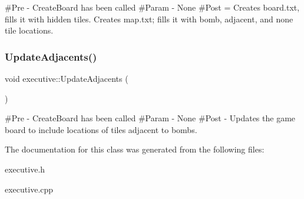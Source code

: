 \#\+Pre -\/ Create\+Board has been called \#\+Param -\/ None \#\+Post = Creates board.\+txt, fills it with hidden tiles. Creates map.\+txt; fills it with bomb, adjacent, and none tile locations. \mbox{\label{classexecutive_a19c71fe2ec927ef624ef9dfb155fccc9}} 
\subsubsection{\texorpdfstring{UpdateAdjacents()}{UpdateAdjacents()}}
{\footnotesize\ttfamily void executive\+::\+Update\+Adjacents (\begin{DoxyParamCaption}{ }\end{DoxyParamCaption})}

\#\+Pre -\/ Create\+Board has been called \#\+Param -\/ None \#\+Post -\/ Updates the game board to include locations of tiles adjacent to bombs. 

The documentation for this class was generated from the following files\+:\begin{DoxyCompactItemize}
\item 
executive.\+h\item 
executive.\+cpp\end{DoxyCompactItemize}
